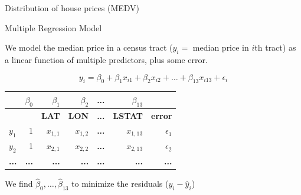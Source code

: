 \documentclass{beamer}\usepackage[]{graphicx}\usepackage[]{color}
\newenvironment{knitrout}{}{} %
\begin{document}
\begin{darkframes}
\begin{frame}[fragile]{Distribution of house prices (MEDV)}
\begin{knitrout}
\end{knitrout}
    \end{frame}
    
    
        \begin{frame}{Multiple Regression Model}
      
      We model the median price in a census tract ($y_i=$ median price in $i$th tract) as a linear function of multiple predictors, plus some error.
      
      \[
        y_i = \beta_0 + \beta_1 x_{i1} + \beta_2 x_{i2} +\ldots + \beta_{13} x_{i13} + \epsilon_i
      \]
      
    \begin{table}[!b]
        {\carlitoTLF %
        \begin{tabularx}{\textwidth}{Xrrrrrr}
           
           & $\beta_0$ & $\beta_1$ & $\beta_2$ & \textbf{...} &   $\beta_{13}$ & \\
          \toprule

          & & \textbf{LAT} & \textbf{LON} & \textbf{...} &   \textbf{LSTAT} & \textbf{error}\\
          \toprule
    $y_1$ & 1 & $x_{1,1}$ & $x_{1,2}$  & \textbf{...} & $x_{1,13}$ & $\epsilon_1$  \\
    $y_2$ & 1 & $x_{2,1}$ & $x_{2,2}$  & \textbf{...} & $x_{2,13}$ & $\epsilon_2$\\
    \textbf{...}  & \textbf{...} &  \textbf{...} & \textbf{...}  & \textbf{...} &   \textbf{...}  & \textbf{...}\\
      
          \bottomrule
        \end{tabularx}}
        
      \end{table}     
     
      \bigskip\pause
      
      We find $\hat\beta_0,\ldots,\hat\beta_{13}$ to minimize the residuals ($y_i-\hat y_i$)
      
    \end{frame}
    

\end{darkframes}
\end{document}
